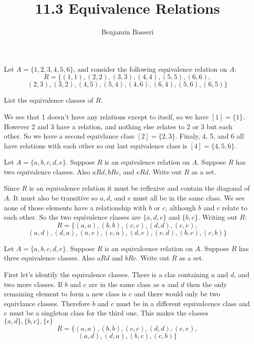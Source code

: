 \documentclass{article}
\title{11.3 Equivalence Relations}
\author{Benjamin Basseri}
\date{}
\begin{document}
\maketitle

\begin{problem}
Let $A = \{1, 2, 3, 4, 5, 6\}$, and consider the following equivalence relation on $A$:
$$R = \{(1, 1), (2, 2), (3, 3), (4, 4), (5, 5), (6, 6),$$
$$(2, 3), (3, 2), (4, 5), (5, 4), (4, 6), (6, 4), (5, 6), (6, 5)\}$$

List the equivalence classes of $R$.
\end{problem}

We see that 1 doesn't have any relations except to itself, so we have $[1] = \{1\}$. However 2 and 3 have a relation, and nothing else relates to 2 or 3 but each other. So we have a second equivlance class $[2] = \{2, 3\}$. Finaly, 4, 5, and 6 all have relations with each other so our last equivalence class is $[4] = \{4, 5, 6\}$.

\begin{problem}
Let $A = \{a, b, c, d, e\}$. Suppose $R$ is an equivalence relation on $A$. Suppose $R$ has two equivalence classes. Also $aRd, bRc$, and $eRd$. Write out $R$ as a set.
\end{problem}

Since $R$ is an equivalence relation it must be reflexive and contain the diagonal of $A$. It must also be transitive so $a, d$, and $e$ must all be in the same class. We see none of those elements have a relationship with $b$ or $c$, although $b$ and $c$ relate to each other. So the two equivalence classes are $\{a, d, e\}$ and $\{b, c\}$. Writing out $R$:
$$R = \{(a, a), (b, b), (c, c), (d, d), (e, e), $$
$$(a, d), (d, a), (a, e), (e, a), (d, e), (e, d), (b, c), (c, b)\}$$

\begin{problem}
Let $A = \{a, b, c, d, e\}$. Suppose $R$ is an equivalcence relation on $A$. Suppose $R$ has three equivalence classes. Also $aRd$ and $bRc$. Write out $R$ as a set.
\end{problem}

First let's identify the equivalence classes. There is a clas containing $a$ and $d$, and two more classes. If $b$ and $c$ are in the same class as $a$ and $d$ then the only remaining element to form a new class is $e$ and there would only be two equivlance classes. Therefore $b$ and $c$ must be in a different equivalcence class and $e$ must be a singleton class for the third one. This makes the classes $\{a, d\}, \{b, c\}, \{e\}$
$$R = \{(a, a), (b, b), (c, c), (d, d), (e, e), $$
$$(a, d), (d, a), (b, c), (c, b)\}$$
\end{document}
